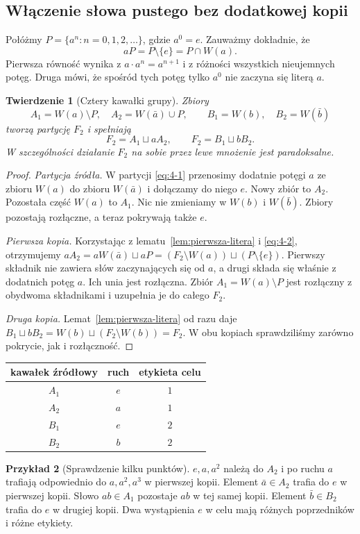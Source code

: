 \documentclass[11pt,a4paper]{article}
\numberwithin{equation}{section}
\theoremstyle{plain}
\newtheorem{twierdzenie}{Twierdzenie}[section]
\theoremstyle{definition}
\newtheorem{przyklad}[twierdzenie]{Przykład}
\theoremstyle{remark}
\begin{document}
\subsection{Włączenie słowa pustego bez dodatkowej kopii}
Połóżmy $P=\{a^n:n=0,1,2,\ldots\}$, gdzie $a^0=e$. Zauważmy dokładnie, że
\begin{equation}\label{eq:4-2}
 aP=P\setminus\{e\}=P\cap W(a).
\end{equation}
Pierwsza równość wynika z $a\cdot a^n=a^{n+1}$ i z różności wszystkich nieujemnych potęg. Druga mówi, że spośród tych potęg tylko $a^0$ nie zaczyna się literą $a$.
\begin{twierdzenie}[Cztery kawałki grupy]\label{tw:cztery-kawalki}
Zbiory
\begin{equation}\label{eq:4-3}
 A_1=W(a)\setminus P,\quad A_2=W(\bar a)\cup P,
 \qquad B_1=W(b),\quad B_2=W(\bar b)
\end{equation}
tworzą partycję $F_2$ i spełniają
\begin{equation}\label{eq:4-4}
 F_2=A_1\sqcup aA_2,\qquad F_2=B_1\sqcup bB_2.
\end{equation}
W szczególności działanie $F_2$ na sobie przez lewe mnożenie jest paradoksalne.
\end{twierdzenie}
\begin{proof}
\emph{Partycja źródła.} W partycji \eqref{eq:4-1} przenosimy dodatnie potęgi $a$ ze zbioru $W(a)$ do zbioru $W(\bar a)$ i dołączamy do niego $e$. Nowy zbiór to $A_2$. Pozostała część $W(a)$ to $A_1$. Nic nie zmieniamy w $W(b)$ i $W(\bar b)$. Zbiory pozostają rozłączne, a teraz pokrywają także $e$.

\emph{Pierwsza kopia.} Korzystając z lematu~\ref{lem:pierwsza-litera} i \eqref{eq:4-2}, otrzymujemy $aA_2=aW(\bar a)\sqcup aP=(F_2\setminus W(a))\sqcup(P\setminus\{e\})$. Pierwszy składnik nie zawiera słów zaczynających się od $a$, a drugi składa się właśnie z dodatnich potęg $a$. Ich unia jest rozłączna. Zbiór $A_1=W(a)\setminus P$ jest rozłączny z obydwoma składnikami i uzupełnia je do całego $F_2$.

\emph{Druga kopia.} Lemat~\ref{lem:pierwsza-litera} od razu daje $B_1\sqcup bB_2=W(b)\sqcup(F_2\setminus W(b))=F_2$. W obu kopiach sprawdziliśmy zarówno pokrycie, jak i rozłączność.
\end{proof}
\begin{center}
\begin{tabular}{c|c|c}
 kawałek źródłowy&ruch&etykieta celu\\\hline
 $A_1$&$e$&$1$\\ $A_2$&$a$&$1$\\ $B_1$&$e$&$2$\\ $B_2$&$b$&$2$
\end{tabular}
\end{center}
\begin{przyklad}[Sprawdzenie kilku punktów]
$e,a,a^2$ należą do $A_2$ i po ruchu $a$ trafiają odpowiednio do $a,a^2,a^3$ w pierwszej kopii. Element $\bar a\in A_2$ trafia do $e$ w pierwszej kopii. Słowo $ab\in A_1$ pozostaje $ab$ w tej samej kopii. Element $\bar b\in B_2$ trafia do $e$ w drugiej kopii. Dwa wystąpienia $e$ w celu mają różnych poprzedników i różne etykiety.
\end{przyklad}
\end{document}
